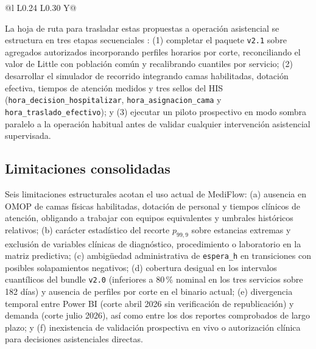 \begin{table}[htbp]
{\begin{tabularx}{\textwidth}{@{}l L{0.24\textwidth} L{0.30\textwidth} Y@{}}
\bottomrule
\end{tabularx}}
\end{table}

La hoja de ruta para trasladar estas propuestas a operación asistencial se estructura en tres etapas secuenciales \parencite{mediflow2026informe}: (1) completar el paquete \texttt{v2.1} sobre agregados autorizados incorporando perfiles horarios por corte, reconciliando el valor de Little con población común y recalibrando cuantiles por servicio; (2) desarrollar el simulador de recorrido integrando camas habilitadas, dotación efectiva, tiempos de atención medidos y tres sellos del HIS (\texttt{hora\_decision\_hospitalizar}, \texttt{hora\_asignacion\_cama} y \texttt{hora\_traslado\_efectivo}); y (3) ejecutar un piloto prospectivo en modo sombra paralelo a la operación habitual antes de validar cualquier intervención asistencial supervisada.

\subsection{Limitaciones consolidadas}

Seis limitaciones estructurales acotan el uso actual de MediFlow: (a) ausencia en OMOP de camas físicas habilitadas, dotación de personal y tiempos clínicos de atención, obligando a trabajar con equipos equivalentes y umbrales históricos relativos; (b) carácter estadístico del recorte $p_{99{,}9}$ sobre estancias extremas y exclusión de variables clínicas de diagnóstico, procedimiento o laboratorio en la matriz predictiva; (c) ambigüedad administrativa de \texttt{espera\_h} en transiciones con posibles solapamientos negativos; (d) cobertura desigual en los intervalos cuantílicos del bundle \texttt{v2.0} (inferiores a 80\,\% nominal en los tres servicios sobre 182 días) y ausencia de perfiles por corte en el binario actual; (e) divergencia temporal entre Power BI (corte abril 2026 sin verificación de republicación) y demanda (corte julio 2026), así como entre los dos reportes comprobados de largo plazo; y (f) inexistencia de validación prospectiva en vivo o autorización clínica para decisiones asistenciales directas.
